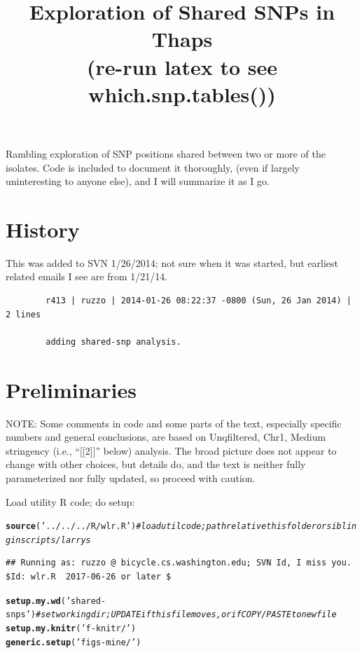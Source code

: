 \documentclass{article}\usepackage[]{graphicx}\usepackage[]{color}
\makeatletter
\newcommand{\hlstr}[1]{\textcolor[rgb]{0.192,0.494,0.8}{#1}}%
\newcommand{\hlcom}[1]{\textcolor[rgb]{0.678,0.584,0.686}{\textit{#1}}}%
\newcommand{\hlstd}[1]{\textcolor[rgb]{0.345,0.345,0.345}{#1}}%
\newcommand{\hlkwd}[1]{\textcolor[rgb]{0.737,0.353,0.396}{\textbf{#1}}}%
\newenvironment{kframe}{%
 \def\at@end@of@kframe{}%
 \ifinner\ifhmode%
  \def\at@end@of@kframe{\end{minipage}}%
  \begin{minipage}{\columnwidth}%
 \fi\fi%
 \def\FrameCommand##1{\hskip\@totalleftmargin \hskip-\fboxsep
 \colorbox{shadecolor}{##1}\hskip-\fboxsep
     \hskip-\linewidth \hskip-\@totalleftmargin \hskip\columnwidth}%
 \MakeFramed {\advance\hsize-\width
   \@totalleftmargin\z@ \linewidth\hsize
   \@setminipage}}%
 {\par\unskip\endMakeFramed%
 \at@end@of@kframe}
\newenvironment{knitrout}{}{} %
\providecommand{\whichsnptables}{(re-run latex to see which.snp.tables())}
\makeatother
\begin{document}
\pagestyle{headings}
\title{Exploration of Shared SNPs in Thaps\\\large\whichsnptables}
\maketitle

Rambling exploration of SNP positions shared between two or more of the isolates.  Code is included to 
document it thoroughly, (even if largely uninteresting to anyone else), and I will summarize it as I go.

\tableofcontents

\section{History}
This was added to SVN 1/26/2014; not sure when it was started, but earliest related emails I see are from 1/21/14.
{\scriptsize
\begin{verbatim}
        r413 | ruzzo | 2014-01-26 08:22:37 -0800 (Sun, 26 Jan 2014) | 2 lines

        adding shared-snp analysis.
\end{verbatim}
}

\section{Preliminaries}

NOTE: Some comments in code and some parts of the text, especially specific numbers and general 
conclusions, are based on Unqfiltered, Chr1, Medium stringency (i.e., ``[[2]]'' below) analysis.  
The broad picture does not appear to change with other choices, but details do, and the text is  
neither fully parameterized nor fully updated, so proceed with caution.  

Load utility R code; do setup:

\begin{knitrout}\footnotesize
{}\color{fgcolor}\begin{kframe}
\begin{alltt}
\hlkwd{source}\hlstd{(}\hlstr{'../../../R/wlr.R'}\hlstd{)} \hlcom{# load util code; path relative this folder or sibling in scripts/larrys }
\end{alltt}
\begin{verbatim}
## Running as: ruzzo @ bicycle.cs.washington.edu; SVN Id, I miss you.  $Id: wlr.R  2017-06-26 or later $
\end{verbatim}
\begin{alltt}
\hlkwd{setup.my.wd}\hlstd{(}\hlstr{'shared-snps'}\hlstd{)} \hlcom{# set working dir; UPDATE if this file moves, or if COPY/PASTE to new file}
\hlkwd{setup.my.knitr}\hlstd{(}\hlstr{'f-knitr/'}\hlstd{)}
\hlkwd{generic.setup}\hlstd{(}\hlstr{'figs-mine/'}\hlstd{)}
\end{alltt}
\end{kframe}
\end{knitrout}
\end{document}
